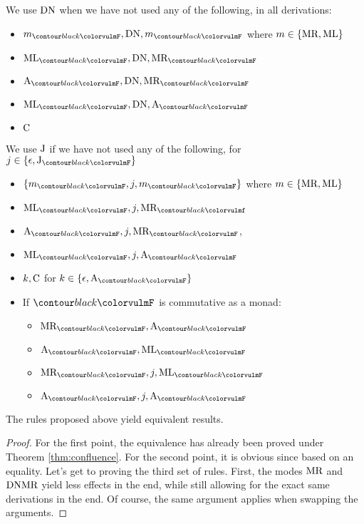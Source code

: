 \noindent We use $\text{DN}$ when we have not used any of the following, in all
derivations:
\begin{multicols}{2}
	\begin{itemize}
		\item $m_{\f{F}}, \combDN, m_{\f{F}}$ where
		      $m \in \{\text{MR}, \text{ML}\}$
		\item $\combML_{\f{F}}, \combDN, \combMR_{\f{F}}$
		\item $\combA_{\f{F}}, \combDN, \combMR_{\f{F}}$
		\item $\combML_{\f{F}}, \combDN, \combA_{\f{F}}$
		\item $\text{C}$
	\end{itemize}
\end{multicols}
\noindent We use $\text{J}$ if we have not used any of the following,
for $j \in \{\epsilon, \combJ_{\f{F}}\}$
\begin{multicols}{2}
	\begin{itemize}
		\item $\left\{m_{\f{F}}, j, m_{\f{F}}\right\}$ where
		      $m \in \{\text{MR}, \text{ML}\}$
		\item $\combML_{\f{F}}, j, \combMR_{\f{f}}$
		\item $\combA_{\f{F}}, j, \combMR_{\f{F}}$,
		\item $\combML_{\f{F}}, j, \combA_{\f{F}}$
		\item $k, \text{C}$ for $k \in \{\epsilon, \combA_{\f{F}}\}$
		\item If $\f{F}$ is commutative as a monad:
		      \begin{itemize}
			      \item $\combMR_{\f{F}}, \combA_{\f{F}}$
			      \item $\combA_{\f{F}}, \combML_{\f{F}}$
			      \item $\combMR_{\f{F}}, j, \combML_{\f{F}}$
			      \item $\combA_{\f{F}}, j, \combA_{\f{F}}$
		      \end{itemize}
	\end{itemize}
\end{multicols}

\begin{thm}
	The rules proposed above yield equivalent results.
\end{thm}
\begin{proof}
	For the first point, the equivalence has already been proved under Theorem
	\ref{thm:confluence}.
	For the second point, it is obvious since based on an equality.
	Let's get to proving the third set of rules.
	First, the modes $\text{MR}$ and $\text{DN}\text{MR}$ yield less effects in the end,
	while still allowing for the exact same derivations in the end.
	Of course, the same argument applies when swapping the arguments.
\end{proof}

